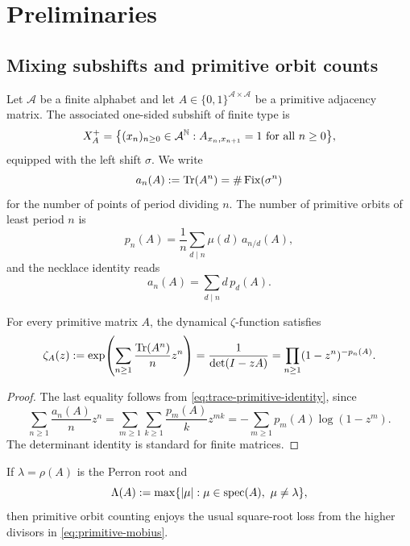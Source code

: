 \section{Preliminaries}\label{sec:preliminaries}

\subsection{Mixing subshifts and primitive orbit counts}

Let \(\mathcal A\) be a finite alphabet and let
\(A\in\{0,1\}^{\mathcal A\times\mathcal A}\) be a primitive adjacency
matrix. The associated one-sided subshift of finite type is
\[
  X_A^+
  =\bigl\{(x_n)_{n\ge 0}\in \mathcal A^{\mathbb{N}}:
    A_{x_n,x_{n+1}}=1\ \text{for all }n\ge 0\bigr\},
\]
equipped with the left shift \(\sigma\). We write
\[
  a_n(A):=\operatorname{Tr}(A^n)=\#\operatorname{Fix}(\sigma^n)
\]
for the number of points of period dividing \(n\). The number of
primitive orbits of least period \(n\) is
\begin{equation}\label{eq:primitive-mobius}
  p_n(A)=\frac{1}{n}\sum_{d\mid n}\mu(d)\,a_{n/d}(A),
\end{equation}
and the necklace identity reads
\begin{equation}\label{eq:trace-primitive-identity}
  a_n(A)=\sum_{d\mid n}d\,p_d(A).
\end{equation}

\begin{proposition}
  \label{prop:prelim-trace-primitive}
  For every primitive matrix \(A\), the dynamical \(\zeta\)-function
  satisfies
  \begin{equation}\label{eq:zeta-def}
    \zeta_A(z)
    :=\exp\!\left(\sum_{n\ge 1}\frac{\operatorname{Tr}(A^n)}{n}z^n\right)
    =\frac{1}{\det(I-zA)}
    =\prod_{n\ge 1}(1-z^n)^{-p_n(A)}.
  \end{equation}
\end{proposition}

\begin{proof}
  The last equality follows from \eqref{eq:trace-primitive-identity},
  since
  \[
    \sum_{n\ge 1}\frac{a_n(A)}{n}z^n
    =\sum_{m\ge 1}\sum_{k\ge 1}\frac{p_m(A)}{k}z^{mk}
    =-\sum_{m\ge 1}p_m(A)\log(1-z^m).
  \]
  The determinant identity is standard for finite matrices.
\end{proof}

If \(\lambda=\rho(A)\) is the Perron root and
\[
  \Lambda(A):=\max\{|\mu|:\mu\in\spec(A),\ \mu\neq\lambda\},
\]
then primitive orbit counting enjoys the usual square-root loss from
the higher divisors in \eqref{eq:primitive-mobius}.


